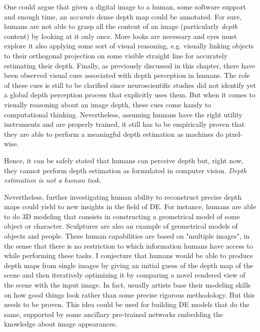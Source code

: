 One could argue that given a digital image to a human, some software support and enough time, an \textit{accurate} dense depth map could be annotated.
For sure, humans are not able to grasp all the content of an image (particularly \textit{depth} content) by looking at it only once.
More looks are necessary and eyes must explore it also applying some sort of visual reasoning, e.g. visually linking objects to their orthogonal projection on some visible straight line for accurately estimating their depth.
Finally, as previously discussed in this chapter, there have been observed visual cues associated with depth perception in humans.
The role of these cues is still to be clarified since neuroscientific studies did not identify yet a global depth perception process that explicitly uses them.
But when it comes to visually reasoning about an image depth, these cues come handy to computational thinking. 
Nevertheless, assuming humans have the right utility instruments and are properly trained, it still has to be empirically proven that they are able to perform a meaningful depth estimation as machines do pixel-wise.

Hence, it can be safely stated that humans can perceive depth but, right now, they cannot perform depth estimation as formulated in computer vision.
\textit{Depth estimation is not a human task}.

Nevertheless, further investigating human ability to reconstruct precise depth maps could yield to new insights in the field of DE.
For instance, humans are able to do 3D modeling that consists in constructing a geometrical model of some object or character.
Sculptures are also an example of geometrical models of objects and people.
These human capabilities are based on "multiple images", in the sense that there is no restriction to which information humans have access to while performing these tasks.
I conjecture that humans would be able to produce depth maps from single images by giving an initial guess of the depth map of the scene and then iteratively optimizing it by comparing a novel rendered view of the scene with the input image.
In fact, usually artists base their modeling skills on how good things look rather than some precise rigorous methodology.
But this needs to be proven.
This idea could be used for building DE models that do the same, supported by some ancillary pre-trained networks embedding the knowledge about image appearances.

\vfill

